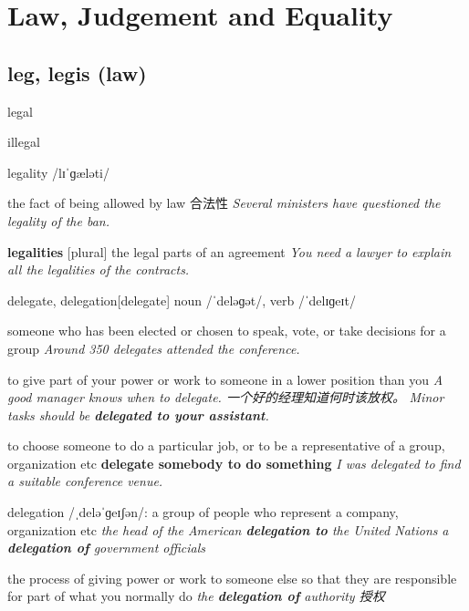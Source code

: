 \chapter{Law, Judgement and Equality}

\section{leg, legis (law)}

\begin{DefWord}{legal}
\end{DefWord}

\begin{DefWord}{illegal}
\end{DefWord}

\begin{DefWord}{legality}
    /lɪˈɡæləti/

    the fact of being allowed by law 合法性
    \textit{Several ministers have questioned the legality of the ban.}

    \textbf{legalities} [plural] the legal parts of an agreement
    \textit{You need a lawyer to explain all the legalities of the contracts.}
\end{DefWord}

\begin{DefWord}{delegate, delegation}[delegate]
    noun /ˈdeləɡət/, verb /ˈdelɪɡeɪt/

    someone who has been elected or chosen to speak, vote, or take decisions for a group
    \textit{Around 350 delegates attended the conference.}

    to give part of your power or work to someone in a lower position than you
    \textit{A good manager knows when to delegate. 一个好的经理知道何时该放权。}
    \textit{Minor tasks should be \textbf{delegated to your assistant}.}

    to choose someone to do a particular job, or to be a representative of a group, organization etc
    \textbf{delegate somebody to do something}
    \textit{I was delegated to find a suitable conference venue.}

    delegation /ˌdeləˈɡeɪʃən/:
    a group of people who represent a company, organization etc
    \textit{the head of the American \textbf{delegation to} the United Nations}
    \textit{a \textbf{delegation of} government officials}

    the process of giving power or work to someone else so that they are responsible for part of what you normally do
    \textit{the \textbf{delegation of} authority 授权}
\end{DefWord}


